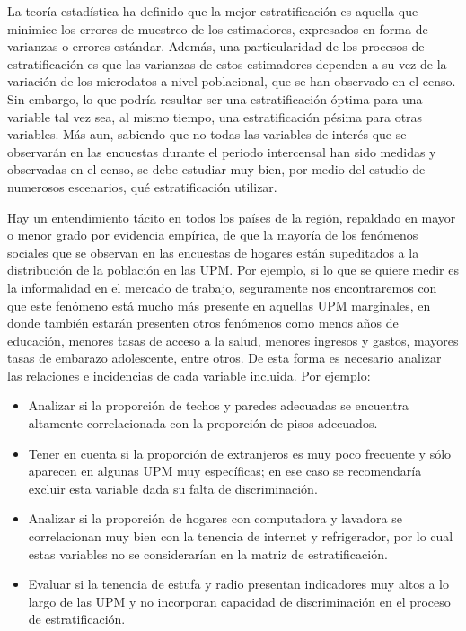 \documentclass[
  10pt,
  spanish,
]{book}
\providecommand{\tightlist}{%
  \setlength{\itemsep}{0pt}\setlength{\parskip}{0pt}}
\begin{document}
La teoría estadística ha definido que la mejor estratificación es aquella que minimice los errores de muestreo de los estimadores, expresados en forma de varianzas o errores estándar. Además, una particularidad de los procesos de estratificación es que las varianzas de estos estimadores dependen a su vez de la variación de los microdatos a nivel poblacional, que se han observado en el censo. Sin embargo, lo que podría resultar ser una estratificación óptima para una variable tal vez sea, al mismo tiempo, una estratificación pésima para otras variables. Más aun, sabiendo que no todas las variables de interés que se observarán en las encuestas durante el periodo intercensal han sido medidas y observadas en el censo, se debe estudiar muy bien, por medio del estudio de numerosos escenarios, qué estratificación utilizar.

Hay un entendimiento tácito en todos los países de la región, repaldado en mayor o menor grado por evidencia empírica, de que la mayoría de los fenómenos sociales que se observan en las encuestas de hogares están supeditados a la distribución de la población en las UPM. Por ejemplo, si lo que se quiere medir es la informalidad en el mercado de trabajo, seguramente nos encontraremos con que este fenómeno está mucho más presente en aquellas UPM marginales, en donde también estarán presenten otros fenómenos como menos años de educación, menores tasas de acceso a la salud, menores ingresos y gastos, mayores tasas de embarazo adolescente, entre otros. De esta forma es necesario analizar las relaciones e incidencias de cada variable incluida. Por ejemplo:

\begin{itemize}
\tightlist
\item
  Analizar si la proporción de techos y paredes adecuadas se encuentra altamente correlacionada con la proporción de pisos adecuados.
\item
  Tener en cuenta si la proporción de extranjeros es muy poco frecuente y sólo aparecen en algunas UPM muy específicas; en ese caso se recomendaría excluir esta variable dada su falta de discriminación.
\item
  Analizar si la proporción de hogares con computadora y lavadora se correlacionan muy bien con la tenencia de internet y refrigerador, por lo cual estas variables no se considerarían en la matriz de estratificación.
\item
  Evaluar si la tenencia de estufa y radio presentan indicadores muy altos a lo largo de las UPM y no incorporan capacidad de discriminación en el proceso de estratificación.
\end{itemize}
\end{document}
